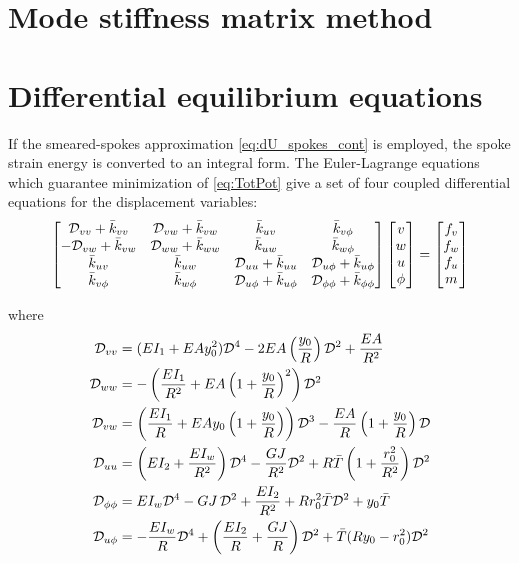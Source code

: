 \documentclass[\rootdir/thesis.tex]{subfiles}
\begin{document}
\section{Mode stiffness matrix method}
\label{sec:ModeMatrix}



\section{Differential equilibrium equations}

If the smeared-spokes approximation \eqref{eq:dU_spokes_cont} is employed, the spoke strain energy is converted to an integral form. The Euler-Lagrange equations which guarantee minimization of \eqref{eq:TotPot} give a set of four coupled differential equations for the displacement variables:
\begin{equation}
\label{eq:EulerLagrange}
\begin{bmatrix}
 \mathcal{D}_{vv} + \bar{k}_{vv} & \mathcal{D}_{vw} + \bar{k}_{vw} & \bar{k}_{uv}              & \bar{k}_{v\phi}\\
-\mathcal{D}_{vw} + \bar{k}_{vw} & \mathcal{D}_{ww} + \bar{k}_{ww} & \bar{k}_{uw}              & \bar{k}_{w\phi}\\
\bar{k}_{uv}            & \bar{k}_{uw}           & \mathcal{D}_{uu} + \bar{k}_{uu}    & \mathcal{D}_{u\phi} + \bar{k}_{u\phi}\\
\bar{k}_{v\phi}            & \bar{k}_{w\phi}           & \mathcal{D}_{u\phi} + \bar{k}_{u\phi} & \mathcal{D}_{\phi\phi} + \bar{k}_{\phi\phi}
\end{bmatrix}
\begin{bmatrix}
v\\w\\u\\\phi
\end{bmatrix}=
\begin{bmatrix}
f_v\\f_w\\f_u\\m
\end{bmatrix}
\end{equation}

where
\begin{align*}
\mathcal{D}_{vv} &= (EI_1 + EAy_0^2)\mathcal{D}^4 - 2EA\left(\frac{y_0}{R}\right)\mathcal{D}^2 + \frac{EA}{R^2}\\
\mathcal{D}_{ww} &= -\left(\frac{EI_1}{R^2} + EA\left(1+\frac{y_0}{R}\right)^2\right)\mathcal{D}^2\\
\mathcal{D}_{vw} &= \left(\frac{EI_1}{R} + EAy_0\left(1+\frac{y_0}{R}\right)\right)\mathcal{D}^3 - \frac{EA}{R}\left(1+\frac{y_0}{R}\right)\mathcal{D}\\
\mathcal{D}_{uu} &= \left(EI_2 + \frac{EI_w}{R^2}\right)\mathcal{D}^4 - \frac{GJ}{R^2}\mathcal{D}^2
    + R\bar{T}\left(1 + \frac{r_0^2}{R^2}\right)\mathcal{D}^2\\
\mathcal{D}_{\phi\phi} &= EI_w\mathcal{D}^4 - GJ\,\mathcal{D}^2 + \frac{EI_2}{R^2}
    + Rr_0^2\bar{T}\mathcal{D}^2 + y_0\bar{T}\\
\mathcal{D}_{u\phi} &= -\frac{EI_w}{R}\mathcal{D}^4 + \left(\frac{EI_2}{R} + \frac{GJ}{R}\right)\mathcal{D}^2
    + \bar{T}(Ry_0 - r_0^2)\mathcal{D}^2
\end{align*}
\end{document}
